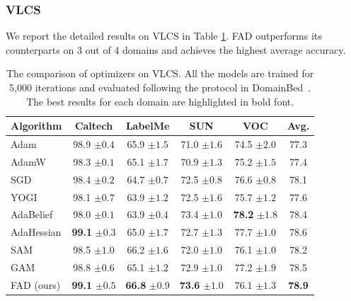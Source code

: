 \subsubsection{VLCS}
We report the detailed results on VLCS in Table \ref{tab:vlcs5k}. FAD outperforms its counterparts on 3 out of 4 domains and achieves the highest average accuracy.

\begin{table}[th]
\centering
\caption{The comparison of optimizers on VLCS. All the models are trained for 5,000 iterations and evaluated following the protocol in DomainBed~\cite{gulrajani2020search}. The best results for each domain are highlighted in bold font.}
\begin{tabular}{lcccc|c}
\toprule
\textbf{Algorithm} & Caltech & LabelMe & SUN & VOC  & \textbf{Avg.} \\
\midrule

Adam & 98.9 \footnotesize{$\pm 0.4$} &  65.9 \footnotesize{$\pm 1.5$} & 71.0 \footnotesize{$\pm 1.6$} & 74.5 \footnotesize{$\pm 2.0$} & 77.3 \\
AdamW  & 98.3 \footnotesize{$\pm 0.1$} &  65.1 \footnotesize{$\pm 1.7$} & 70.9 \footnotesize{$\pm 1.3$} & 75.2 \footnotesize{$\pm 1.5$} & 77.4 \\
SGD  & 98.4 \footnotesize{$\pm 0.2$} &  64.7 \footnotesize{$\pm 0.7$} & 72.5 \footnotesize{$\pm 0.8$} & 76.6 \footnotesize{$\pm 0.8$} & 78.1 \\
YOGI  & 98.1 \footnotesize{$\pm 0.7$} &  63.9 \footnotesize{$\pm 1.2$} & 72.5 \footnotesize{$\pm 1.6$} & 75.7 \footnotesize{$\pm 1.2$} & 77.6 \\
AdaBelief  & 98.0 \footnotesize{$\pm 0.1$} &  63.9 \footnotesize{$\pm 0.4$} & 73.4 \footnotesize{$\pm 1.0$} & \textbf{78.2} \footnotesize{$\pm 1.8$} & 78.4 \\
AdaHessian  & \textbf{99.1} \footnotesize{$\pm 0.3$} &  65.0 \footnotesize{$\pm 1.7$} & 72.7 \footnotesize{$\pm 1.3$} & 77.7 \footnotesize{$\pm 1.0$} & 78.6 \\
SAM  & 98.5 \footnotesize{$\pm 1.0$} & 66.2 \footnotesize{$\pm 1.6$}  & 72.0 \footnotesize{$\pm 1.0$} & 76.1 \footnotesize{$\pm 1.0$} &  78.2 \\
GAM  & 98.8 \footnotesize{$\pm 0.6$} & 65.1 \footnotesize{$\pm 1.2$}  & 72.9 \footnotesize{$\pm 1.0$} & 77.2 \footnotesize{$\pm 1.9$} & 78.5 \\
\midrule
FAD (ours)  & \textbf{99.1} \footnotesize{$\pm 0.5$} & \textbf{66.8} \footnotesize{$\pm 0.9 $}  & \textbf{73.6} \footnotesize{$\pm 1.0 $} & 76.1 \footnotesize{$\pm 1.3$} &  \textbf{78.9} \\

\bottomrule
\end{tabular}
\label{tab:vlcs5k}
\end{table}


